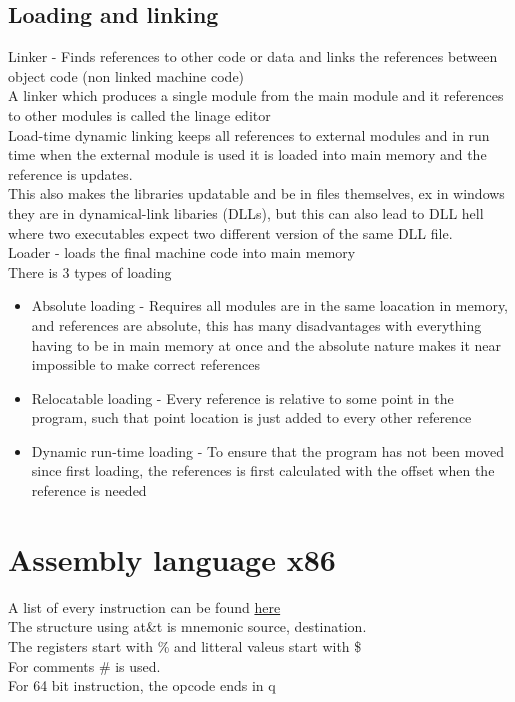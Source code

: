 \documentclass[12pt, a4paper]{article}
\begin{document}
		\subsection{Loading and linking}
			Linker - Finds references to other code or data and links the references between object code (non linked machine code)\\
			A linker which produces a single module from the main module and it references to other modules is called the linage editor\\
			Load-time dynamic linking keeps all references to external modules and in run time when the external module is used it is loaded into main memory and the reference is updates.\\
			This also makes the libraries updatable and be in files themselves, ex in windows they are in dynamical-link libaries (DLLs), but this can also lead to DLL hell where two executables expect two different version of the same DLL file.\\[4mm]
			Loader - loads the final machine code into main memory \\
			There is 3 types of loading
			\begin{itemize}
				\item Absolute loading - Requires all modules are in the same loacation in memory, and references are absolute, this has many disadvantages with everything having to be in main memory at once and the absolute nature makes it near impossible to make correct references
				\item Relocatable loading - Every reference is relative to some point in the program, such that point location is just added to every other reference
				\item Dynamic run-time loading - To ensure that the program has not been moved since first loading, the references is first calculated with the offset when the reference is needed
			\end{itemize}
	\section{Assembly language x86}
		A list of every instruction can be found \href{https://www.felixcloutier.com/x86/}{here}\\
		The structure using at\&t is mnemonic source, destination.\\
		The registers start with \% and litteral valeus start with \$\\
		For comments \# is used.\\
		For 64 bit instruction, the opcode ends in q
\end{document}
